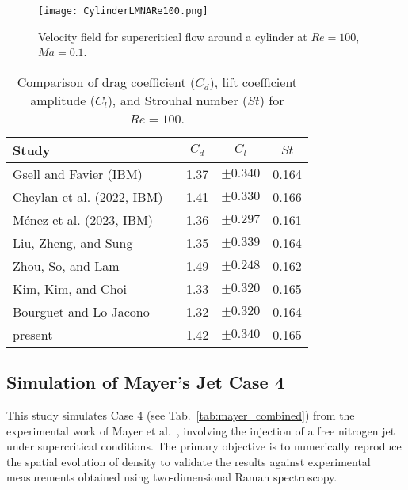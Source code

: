 \begin{figure}[H]
\centering
\texttt{[image: CylinderLMNARe100.png]}
\caption{Velocity field for supercritical  flow around a cylinder at
\(Re = 100\), \(M\!a = 0.1\).}
\label{fig:cylinder_velocity}
\end{figure}

\begin{table}[ht]
    \centering
    \renewcommand{\arraystretch}{1.2}
    \begin{tabular}{|l|c|c|c|}
        \hline
        \textbf{Study} & \textbf{$C_d$} & \textbf{$C_l$} & \textbf{$St$} \\
        \hline
        Gsell and Favier (IBM) ~\cite{gsell2021direct}         & 1.37 & $\pm
        0.340$ & 0.164 \\
        Cheylan et al. (2022, IBM) ~\cite{cheylan2022analysis} & 1.41 & $\pm
        0.330$ & 0.166 \\
        Ménez et al. (2023, IBM) ~\cite{menez2023assessment}   & 1.36 & $\pm
        0.297$ & 0.161 \\
        Liu, Zheng, and Sung ~\cite{liu1998preconditioned}     & 1.35 & $\pm
        0.339$ & 0.164 \\
        Zhou, So, and Lam ~\cite{zhou1999vortex}               & 1.49 & $\pm
        0.248$ & 0.162 \\
        Kim, Kim, and Choi ~\cite{kim2001immersed}             & 1.33 & $\pm
        0.320$ & 0.165 \\
        Bourguet and Lo Jacono ~\cite{bourguet2014flow}        & 1.32 & $\pm
        0.320$ & 0.164 \\
        present                                               & 1.42 & $\pm
        0.340$ & 0.165 \\
        \hline
    \end{tabular}
    \caption{Comparison of drag coefficient (\(C_d\)), lift coefficient amplitude (\(C_l\)), and Strouhal number (\(St\)) for \(Re = 100\).}
    \label{tab:Re100}
\end{table}


\subsection{Simulation of Mayer's Jet Case 4}

This study simulates Case 4 (see Tab.~\ref{tab:mayer_combined}) from the
experimental work of Mayer et al.~\cite{mayer2003raman}, involving the injection
of a free nitrogen jet under supercritical conditions. The primary objective is
to numerically reproduce the spatial evolution of density to validate the
results against experimental measurements obtained using two-dimensional Raman
spectroscopy.


